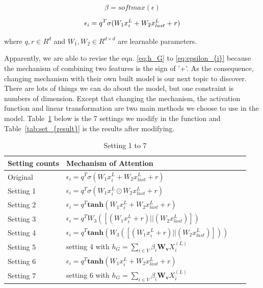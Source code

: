 \documentclass{article}
\begin{document}
\begin{equation}
    \label{eq:beta}
    \beta = softmax(\epsilon)
\end{equation}

\begin{equation}
    \label{eq:epsilon_{i}}
    \epsilon_{i} = q^{T}\sigma(W_1x_i^{L} + W_2x_{last}^{L} + r)
\end{equation}

where $q,r \in R^d$ and $W_1,W_2 \in R^{d \times d}$ are learnable parameters.

Apparently, we are able to revise the eqn.
\ref{eq:h_G} to \ref{eq:epsilon_{i}} because
the mechanism of combining two features is the sign of '+'.
As the consequence, changing mechanism with their own built model
is our next topic to discover.
There are lots of things we can do about the model,
but one constraint is numbers of dimension.
Except that changing the mechanism,
the activation function and linear transformation are
two main methods we choose to use in the model.
Table~\ref{tab:setting} below is the 7 settings we modify
in the function and Table~\ref{tab:set_{result}}
is the results after modifying.

\begin{table}
    \caption{Setting 1 to 7}
    \label{tab:setting}
    \centering
    \begin{tabular}{llll}
        \toprule
        Setting counts & Mechanism of Attention                                                          \\
        \midrule
        Original       & $\epsilon_{i} = q^{T}\sigma(W_1x_i^{L} + W_2x_{last}^{L} + r)$                  \\
        Setting 1      & $\epsilon_{i} = q^{T}\sigma(W_1x_i^{L} \odot W_2x_{last}^{L} + r)$              \\
        Setting 2      & $\epsilon_{i} = q^{T}\textbf{tanh}(W_1x_i^{L} + W_2x_{last}^{L} + r)$           \\
        Setting 3      & $\epsilon_{i} = q^{T}W_3([(W_1x_i^{L} + r)||(W_2x_{last}^{L})])$                \\
        Setting 4      & $\epsilon_{i} = q^{T}\textbf{tanh}(W_3([(W_1x_i^{L} + r)||(W_2x_{last}^{L})]))$ \\
        Setting 5      & setting 4 with $h_G = \sum_{i \in V}\beta_{i}\bm{W_{v}}X_{i}^{(L)}$             \\
        Setting 6      & $\epsilon_{i} = q^{T}\textbf{tanh}(W_1x_i^{L} + W_2x_{last}^{L} + r)$           \\
        Setting 7      & setting 6 with $h_G = \sum_{i \in V}\beta_{i}\bm{W_{v}}X_{i}^{(L)}$             \\
        \bottomrule
    \end{tabular}
\end{table}
\end{document}
